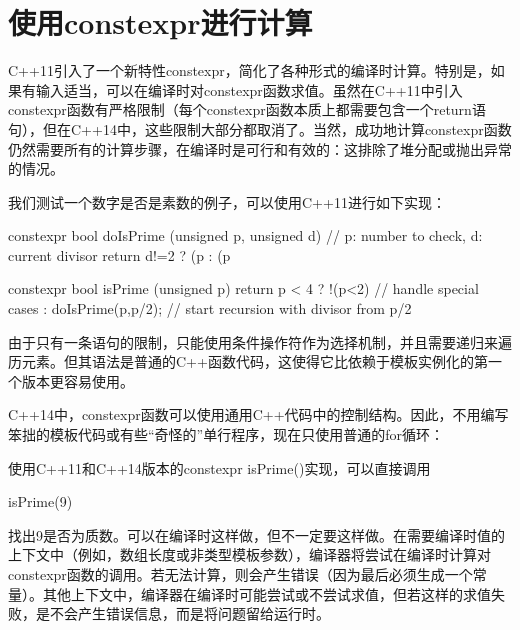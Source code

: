 \section{使用constexpr进行计算}
C++11引入了一个新特性constexpr，简化了各种形式的编译时计算。特别是，如果有输入适当，可以在编译时对constexpr函数求值。虽然在C++11中引入constexpr函数有严格限制（每个constexpr函数本质上都需要包含一个return语句），但在C++14中，这些限制大部分都取消了。当然，成功地计算constexpr函数仍然需要所有的计算步骤，在编译时是可行和有效的：这排除了堆分配或抛出异常的情况。

我们测试一个数字是否是素数的例子，可以使用C++11进行如下实现：

\begin{cpp}
constexpr bool
doIsPrime (unsigned p, unsigned d) // p: number to check, d: current divisor
{
	return d!=2 ? (p%
	: (p%
}

constexpr bool isPrime (unsigned p)
{
	return p < 4 ? !(p<2) // handle special cases
	: doIsPrime(p,p/2); // start recursion with divisor from p/2
}
\end{cpp}

由于只有一条语句的限制，只能使用条件操作符作为选择机制，并且需要递归来遍历元素。但其语法是普通的C++函数代码，这使得它比依赖于模板实例化的第一个版本更容易使用。

C++14中，constexpr函数可以使用通用C++代码中的控制结构。因此，不用编写笨拙的模板代码或有些“奇怪的”单行程序，现在只使用普通的for循环：


使用C++11和C++14版本的constexpr isPrime()实现，可以直接调用

\begin{cpp}
isPrime(9)
\end{cpp}

找出9是否为质数。可以在编译时这样做，但不一定要这样做。在需要编译时值的上下文中（例如，数组长度或非类型模板参数），编译器将尝试在编译时计算对constexpr函数的调用。若无法计算，则会产生错误（因为最后必须生成一个常量）。其他上下文中，编译器在编译时可能尝试或不尝试求值，但若这样的求值失败，是不会产生错误信息，而是将问题留给运行时。


